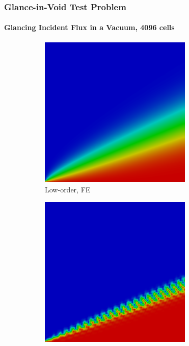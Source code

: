 \begin{frame}
\frametitle{Glance-in-Void Test Problem}
\framesubtitle{Glancing Incident Flux in a Vacuum, 4096 cells}

\begin{figure}[h]
   \centering
   \begin{subfigure}{0.3\textwidth}
      \centering
      \includegraphics[width=0.8\textwidth]{./figures/glance_DMP_FE.png}
      \caption{Low-order, FE}
   \end{subfigure}
   \begin{subfigure}{0.3\textwidth}
      \centering
      \includegraphics[width=0.8\textwidth]{./figures/glance_GalFCT_FE.png}

\end{subfigure}
\end{figure}
\end{frame}

